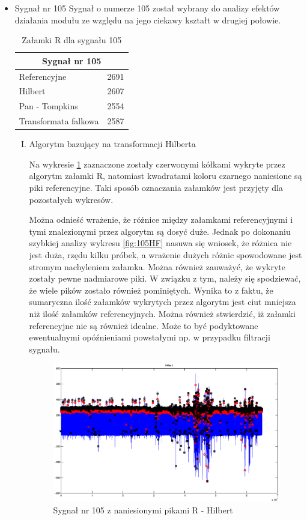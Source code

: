 \begin{itemize}
\item Sygnał nr 105
%
%
%
%
Sygnał o numerze 105 został wybrany do analizy efektów działania modułu ze względu na jego ciekawy kształt w drugiej połowie.

\begin{table}[H]
\centering
\label{105peaks}
\caption{Załamki R dla sygnału 105}
\begin{tabular}{|l|c|}
\hline
\multicolumn{2}{|c|}{Sygnał nr 105}\\
\hline
Referencyjne & 2691 \\ \hline
Hilbert & 2607 \\ \hline
Pan - Tompkins & 2554 \\ \hline
Transformata falkowa & 2587 \\ \hline
\end{tabular}
\end{table}

\begin{enumerate}[I.]
\item Algorytm bazujący na transformacji Hilberta

Na wykresie \ref{fig:105HC} zaznaczone zostały czerwonymi kółkami wykryte przez algorytm załamki R, natomiast kwadratami koloru czarnego naniesione są piki referencyjne. Taki sposób oznaczania załamków jest przyjęty dla pozostałych wykresów.

Można odnieść wrażenie, że różnice między załamkami referencyjnymi i tymi znalezionymi przez algorytm są dosyć duże. Jednak po dokonaniu szybkiej analizy wykresu \ref{fig:105HF} nasuwa się wniosek, że różnica nie jest duża, rzędu kilku próbek, a wrażenie dużych różnic spowodowane jest stromym nachyleniem załamka. Można również zauważyć, że wykryte zostały pewne nadmiarowe piki. W związku z tym, należy się spodziewać, że wiele pików zostało również pominiętych. Wynika to z faktu, że sumaryczna ilość załamków wykrytych przez algorytm jest ciut mniejsza niż ilość załamków referencyjnych. Można również stwierdzić, iż załamki referencyjne nie są również idealne. Może to być podyktowane ewentualnymi opóźnieniami powstałymi np. w przypadku filtracji sygnału.
\newpage
\begin{figure}[H]
\centering
\includegraphics[scale=0.35]{R_PEAKS/wektorowe/105_hilbert_calosc.eps}
\caption{Sygnał nr 105 z naniesionymi pikami R - Hilbert}
\label{fig:105HC}
\end{figure}


\end{enumerate}
\end{itemize}
